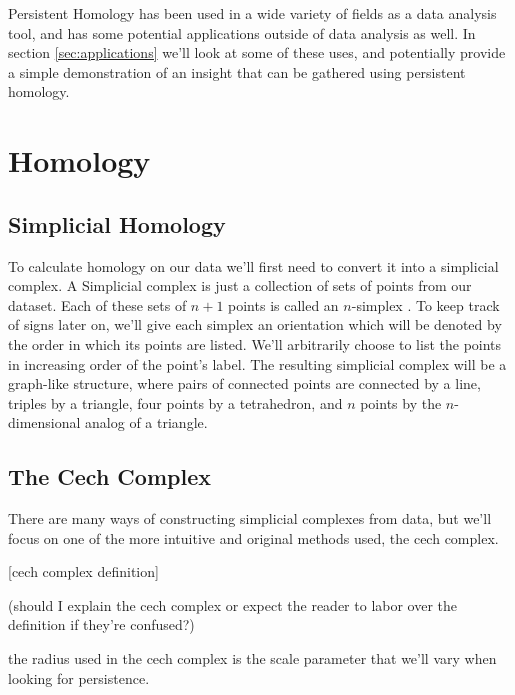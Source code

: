 Persistent Homology has been used in a wide variety of fields as a data analysis tool, and has some potential applications outside of data analysis as well.
In section \ref{sec:applications} we'll look at some of these uses, and potentially provide a simple demonstration of an insight that can be gathered using persistent homology.

\section{Homology}\label{sec:homology}

\subsection{Simplicial Homology}\label{sec:simplicial-homology}
To calculate homology on our data we'll first need to convert it into a simplicial complex.
A Simplicial complex is just a collection of sets of points from our dataset. Each of these sets of \(n+1\) points is called an \(n\)-simplex .
To keep track of signs later on, we'll give each simplex an orientation which will be denoted by the order in which its points are listed.
We'll arbitrarily choose to list the points in increasing order of the point's label.
The resulting simplicial complex will be a graph-like structure, where pairs of connected points are connected by a line, triples by a triangle, four points by a tetrahedron, and \(n\) points by the \(n\)-dimensional analog of a triangle.

\begin{figure}
    
    \caption{}
    \label{fig:basic-simplices}
\end{figure}

\subsection{The Cech Complex}\label{sec:cech-complex}

There are many ways of constructing simplicial complexes from data, but we'll focus on one of the more intuitive and original methods used, the cech complex.

[cech complex definition]

(should I explain the cech complex or expect the reader to labor over the definition if they're confused?)

the radius used in the cech complex is the scale parameter that we'll vary when looking for persistence.

